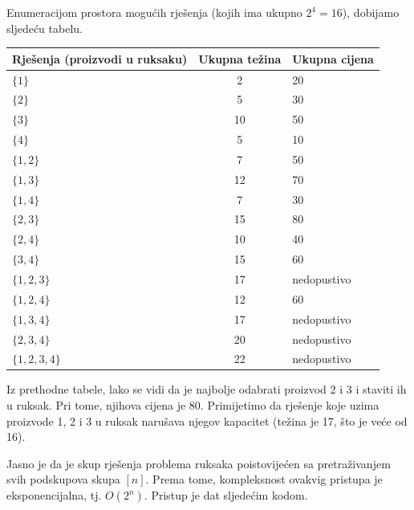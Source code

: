 Enumeracijom prostora mogućih rješenja (kojih ima ukupno $2^4=16$), dobijamo sljedeću tabelu.
\begin{center}
	\begin{tabular}{lcl}
     Rješenja (proizvodi u ruksaku) & Ukupna težina & Ukupna cijena \\ \hline
	$\{1\}$	&   2     &  20 \\
	$\{2\}$ &	5	  &  30 \\
	$\{3\}$ &	10    &  50 \\
 	$\{4\}$ &    5	  &  10 \\
	$\{1,2\}$ &	 7    &  50 \\
	$\{1,3\}$  &  12  &  70 \\
    $\{1,4\}$  &   7  &  30 \\
    $\{2,3\}$  & 15   &  80 \\
    $\{2,4\}$  & 10   &  40 \\
     $\{3,4\}$ & 15   &  60 \\
     $\{1,2,3\}$  &17  & nedopustivo \\
     $\{1,2,4\}$  & 12 & 60 \\
      $\{1,3,4\}$ & 17 & nedopustivo \\
      $\{2,3,4\}$ & 20 & nedopustivo \\
      $\{1,2,3,4\}$ & 22 &  nedopustivo \\ \hline
	\end{tabular}
\end{center}
Iz prethodne tabele, lako se vidi da je najbolje odabrati proizvod 2 i 3 i staviti ih u ruksak. Pri tome, njihova   cijena je 80. Primijetimo da  rješenje koje uzima proizvode 1, 2 i 3 u ruksak narušava njegov kapacitet (težina je 17, što je veće od 16). 

Jasno je da je skup rješenja problema ruksaka poistovijećen sa pretraživanjem svih podskupova skupa $[n]$.  Prema tome, kompleksnost ovakvig pristupa je eksponencijalna, tj. $O(2^n)$. Pristup je dat sljedećim 
kodom. 


